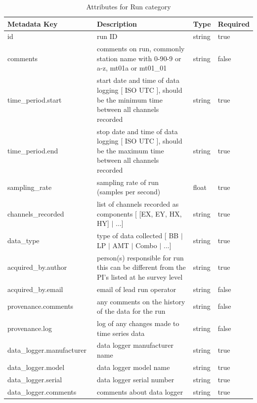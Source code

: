 \documentclass{article}
\begin{document}
\begin{table}[htb!]
    \caption[Attributes for Run]{Attributes for Run category}
    \begin{tabular}{|l|p{3.2in}|l|l|}
        \hline
        \textbf{Metadata Key} & \textbf{Description} & \textbf{Type} & \textbf{Required} \\ \hline
        id\ & run ID & string & true \\ \hline
        comments\ & comments on run, commonly station name with {0-9}{0-9} or {a-z}, mt01a or mt01\_01 & string & false \\ \hline
        time\_period.start\ & start date and time of data logging [ ISO UTC ], should be the minimum time between all channels recorded & string & true \\ \hline
        time\_period.end\ & stop date and time of data logging [ ISO UTC ], should be the maximum time between all channels recorded & string & true \\ \hline
        sampling\_rate\ & sampling rate of run (samples per second) & float & true \\ \hline
        channels\_recorded\ & list of channels recorded as components [ [EX, EY, HX, HY] $|$ ...] & string & true \\ \hline
        data\_type \ & type of data collected [ BB $|$ LP $|$ AMT $|$ Combo $|$ ...] & string & true \\ \hline
        acquired\_by.author\ & person(s) responsible for run this can be different from the PI's listed at he survey level & string & true \\ \hline
        acquired\_by.email\ & email of lead run operator & string & false \\ \hline
        provenance.comments\ & any comments on the history of the data for the run & string & false \\ \hline
        provenance.log\ & log of any changes made to time series data & string & false \\ \hline
        data\_logger.manufacturer\ & data logger manufacturer name & string & true \\ \hline
        data\_logger.model\ & data logger model name & string & true \\ \hline
        data\_logger.serial\ & data logger serial number & string & true \\ \hline
        data\_logger.comments\ & comments about data logger & string & true \\ \hline

\end{tabular}
\end{table}
\end{document}
